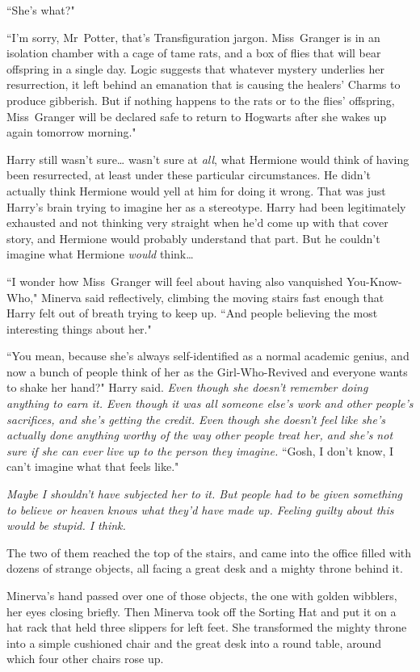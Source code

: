 ``She's what?"

``I'm sorry, Mr~Potter, that's Transfiguration jargon. Miss~Granger is in an isolation chamber with a cage of tame rats, and a box of flies that will bear offspring in a single day. Logic suggests that whatever mystery underlies her resurrection, it left behind an emanation that is causing the healers' Charms to produce gibberish. But if nothing happens to the rats or to the flies' offspring, Miss~Granger will be declared safe to return to Hogwarts after she wakes up again tomorrow morning."

Harry still wasn't sure{\ldots} wasn't sure at \emph{all}, what Hermione would think of having been resurrected, at least under these particular circumstances. He didn't actually think Hermione would yell at him for doing it wrong. That was just Harry's brain trying to imagine her as a stereotype. Harry had been legitimately exhausted and not thinking very straight when he'd come up with that cover story, and Hermione would probably understand that part. But he couldn't imagine what Hermione \emph{would} think{\ldots}

``I wonder how Miss~Granger will feel about having also vanquished You-Know-Who," Minerva said reflectively, climbing the moving stairs fast enough that Harry felt out of breath trying to keep up. ``And people believing the most interesting things about her."

``You mean, because she's always self-identified as a normal academic genius, and now a bunch of people think of her as the Girl-Who-Revived and everyone wants to shake her hand?" Harry said. \emph{Even though she doesn't remember doing anything to earn it. Even though it was all someone else's work and other people's sacrifices, and she's getting the credit. Even though she doesn't feel like she's actually done anything worthy of the way other people treat her, and she's not sure if she can ever live up to the person they imagine.} ``Gosh, I don't know, I can't imagine what that feels like."

\emph{Maybe I shouldn't have subjected her to it. But people had to be given \emph{something} to believe or heaven knows what they'd have made up. Feeling guilty about this would be stupid. I think.}

The two of them reached the top of the stairs, and came into the office filled with dozens of strange objects, all facing a great desk and a mighty throne behind it.

Minerva's hand passed over one of those objects, the one with golden wibblers, her eyes closing briefly. Then Minerva took off the Sorting Hat and put it on a hat rack that held three slippers for left feet. She transformed the mighty throne into a simple cushioned chair and the great desk into a round table, around which four other chairs rose up.

